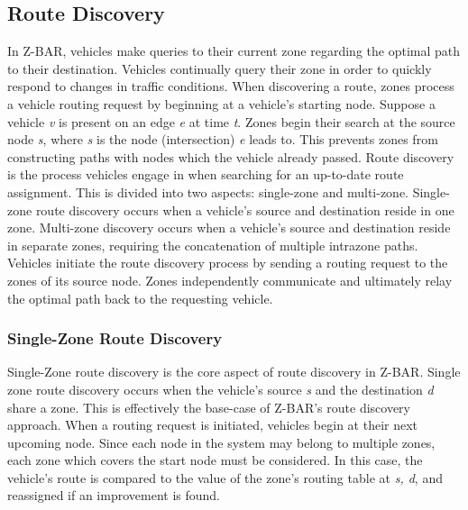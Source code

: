 \documentclass[conference]{IEEEtran}
\begin{document}
\subsection{Route Discovery}

In Z-BAR, vehicles make queries to their current zone regarding the optimal path to their destination. Vehicles continually query their zone in order to quickly respond to changes in traffic conditions. When discovering a route, zones process a vehicle routing request by beginning at a vehicle's starting node. Suppose a vehicle \textit{v} is present on an edge \textit{e} at time \textit{t}. Zones begin their search at the source node \textit{s}, where \textit{s} is the node (intersection) \textit{e} leads to. This prevents zones from constructing paths with nodes which the vehicle already passed. Route discovery is the process vehicles engage in when searching for an up-to-date route assignment. This is divided into two aspects: single-zone and multi-zone. Single-zone route discovery occurs when a vehicle's source and destination reside in one zone. Multi-zone discovery occurs when a vehicle's source and destination reside in separate zones, requiring the concatenation of multiple intrazone paths. Vehicles initiate the route discovery process by sending a routing request to the zones of its source node. Zones independently communicate and ultimately relay the optimal path back to the requesting vehicle.

\subsubsection{Single-Zone Route Discovery}

Single-Zone route discovery is the core aspect of route discovery in Z-BAR. Single zone route discovery occurs when the vehicle's source \textit{s} and the destination \textit{d} share a zone. This is effectively the base-case of Z-BAR's route discovery approach. When a routing request is initiated, vehicles begin at their next upcoming node. Since each node in the system may belong to multiple zones, each zone which covers the start node must be considered. In this case, the vehicle's route is compared to the value of the zone's routing table at \textit{s, d}, and reassigned if an improvement is found.

\end{document}
